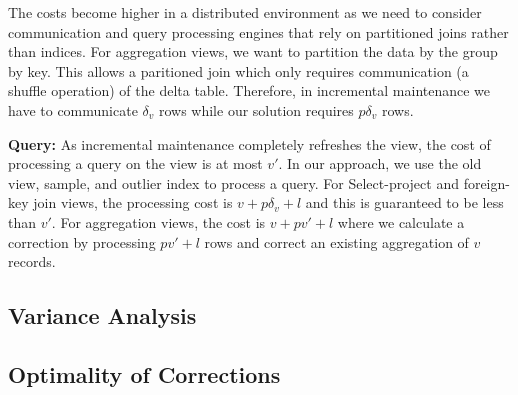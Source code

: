 The costs become higher in a distributed environment as we need to consider communication and query processing engines that rely on partitioned joins rather than indices.
For aggregation views, we want to partition the data by the group by key.
This allows a paritioned join which only requires communication (a shuffle operation) of the delta table.
Therefore, in incremental maintenance we have to communicate $\delta_v$ rows while our solution requires $p\delta_v$ rows.

\textbf{Query: } As incremental maintenance completely refreshes the view, the cost of processing a query on the view is at most $v'$. In our approach, we use the old view, sample, and outlier index to process a query. For Select-project and foreign-key join views, the processing cost is $v + p\delta_v + l$ and this is guaranteed to be less than $v'$. For aggregation views, the cost is $v + pv'+l$ where we calculate a correction by processing $pv'+l$ rows and correct an existing aggregation of $v$ records.

\subsection{Variance Analysis}

\subsection{Optimality of Corrections}